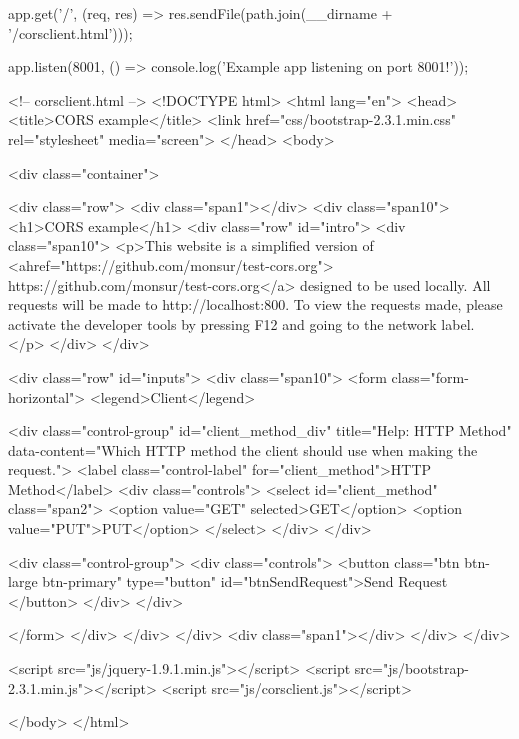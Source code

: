\begin{Exercise}[label={websec-cors-practs}]
\begin{js}
app.get('/', (req, res) => res.sendFile(path.join(__dirname + '/corsclient.html')));

app.listen(8001, () => console.log('Example app listening on port 8001!'));
\end{js}

\begin{html}
<!-- corsclient.html -->
<!DOCTYPE html>
<html lang="en">
<head>
<title>CORS example</title>
<link href="css/bootstrap-2.3.1.min.css" rel="stylesheet" media="screen">
</head>
<body>

<div class="container">

<div class="row">
<div class="span1"></div>
<div class="span10">
<h1>CORS example</h1>
<div class="row" id="intro">
<div class="span10">
<p>This website is a simplified version of 
<ahref="https://github.com/monsur/test-cors.org">
https://github.com/monsur/test-cors.org</a>
designed to be used locally.
All requests will be made to http://localhost:800. To view the requests made, please activate
the developer tools by pressing F12 and going to the network label.
</p>
</div>
</div>

<div class="row" id="inputs">
<div class="span10">
<form class="form-horizontal">
<legend>Client</legend>

<div class="control-group" id="client_method_div" title="Help: HTTP Method"
data-content="Which HTTP method the client should use when making the request.">
<label class="control-label" for="client_method">HTTP Method</label>
<div class="controls">
<select id="client_method" class="span2">
<option value="GET" selected>GET</option>
<option value="PUT">PUT</option>
</select>
</div>
</div>


<div class="control-group">
<div class="controls">
<button class="btn btn-large btn-primary" type="button" id="btnSendRequest">Send
Request
</button>
</div>
</div>

</form>
</div>
</div>
</div>
<div class="span1"></div>
</div>
</div>

<script src="js/jquery-1.9.1.min.js"></script>
<script src="js/bootstrap-2.3.1.min.js"></script>
<script src="js/corsclient.js"></script>

</body>
</html>
\end{html}
\end{Exercise}
